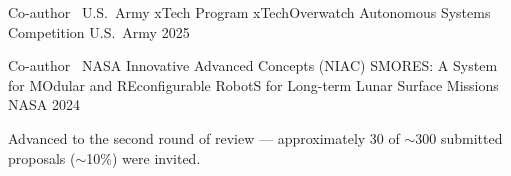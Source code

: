
\begin{cventries}
  \cventry
    {Co-author \textperiodcentered\ U.S.\ Army xTech Program}
    {xTechOverwatch Autonomous Systems Competition}
    {U.S.\ Army}
    {2025}
    {
    }

  \cventry
    {Co-author \textperiodcentered\ NASA Innovative Advanced Concepts (NIAC)}
    {SMORES: A System for MOdular and REconfigurable RobotS for Long-term Lunar Surface Missions}
    {NASA}
    {2024}
    {
      \begin{cvitems}
        \item Advanced to the second round of review --- approximately 30 of $\sim$300 submitted proposals ($\sim$10\%) were invited.
      \end{cvitems}
    }
\end{cventries}
